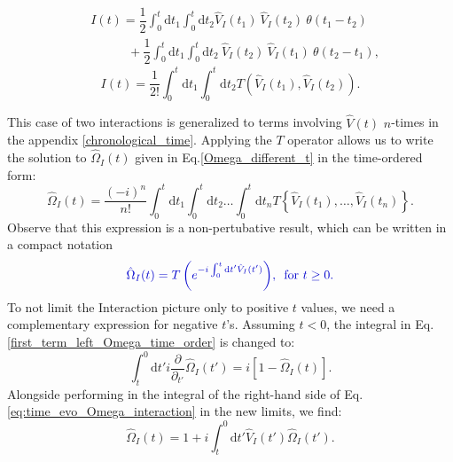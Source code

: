\documentclass[12pt, titlepage]{article}
\begin{document}
\begin{equation*}
\begin{split}
&I(t)=\dfrac{1}{2}
\int_{0}^{t}\mathrm{d}t_1\int_{0}^{t}\! \! \mathrm{d}t_2
\hat{V}_{I}(t_1)\ \hat{V}_{I}(t_2)\ \theta (t_1 -t_2)
\\
&\quad\qquad
+
\dfrac{1}{2}
\int_{0}^{t}\mathrm{d}t_1\int_{0}^{t}\! \! \mathrm{d}t_2
\ \hat{V}_{I}(t_2)\  \hat{V}_{I}(t_1) \ \theta (t_2-t_1)
,
\end{split}
\end{equation*}
\begin{equation}
I(t)=\dfrac{1}{2!}
\int_{0}^{t}\mathrm{d}t_1\int_{0}^{t}\! \! \mathrm{d}t_2
T(\hat{V}_{I}(t_1),\hat{V}_{I}(t_2))
.
\end{equation}

This case of two interactions is generalized to terms involving $\hat{V}(t) $ $ n $-times in the appendix \ref{chronological_time}.  
Applying the $ T $ operator allows us to write the solution to $ \hat{\Omega}_{I}(t) $ given in Eq.\enskip\eqref{Omega_different_t} in the time-ordered form:
\begin{equation}
\hat{\Omega}_{I}(t)
=
\frac{(-i)^{n}}{n!}
\int_{0}^{t}\mathrm{d}t_1\int_{0}^{t}\! \! \mathrm{d}t_2
 \ldots
 \int_{0}^{t}\! \! \mathrm{d}t_n
 T\left\lbrace \hat{V}_{I}(t_1), \ldots , \hat{V}_{I}(t_n)\right\rbrace 
 .
\end{equation}
Observe that this expression is a non-pertubative result, which can  be written in a compact notation
\begin{equation}\label{eq:Omega_I_Chron_0}
\textcolor[RGB]{0,0,204}{
\hat{\Omega}_{I}(t)
=T\left( e^{-i\int_{0}^{t}\mathrm{d}t^{\prime} \hat{V}_{I}(t^{\prime})} \right)
	\! ,\text{\enskip for  }  t\geq 0 
	.}
\end{equation}
To not limit the Interaction picture only to positive $ t $ values, we need a complementary expression for negative $ t $'s. Assuming $ t<0 $, the integral in Eq.\enskip\eqref{first_term_left_Omega_time_order} is changed to:
 \begin{equation}\label{first_term_left_anti_chrono}
 \int_{t}^{0}\mathrm{d}t'
 i
 \frac{\partial}{\partial_{t'}} 
 \hat{\Omega}_{I} (t')
 =
 i
 \left[ 
1 -\hat{\Omega}_{I}(t)
 \right] .
 \end{equation}
 Alongside performing in the integral of the right-hand side of  Eq.\enskip\eqref{eq:time_evo_Omega_interaction} in the new limits, we find:
 \begin{equation}
  \hat{\Omega}_{I}(t)=
1
+
i
\int^{0}_{t}\mathrm{d}t'\hat{V}_{I}(t')\hat{\Omega}_{I}(t')	.
  \end{equation} 
\end{document}
